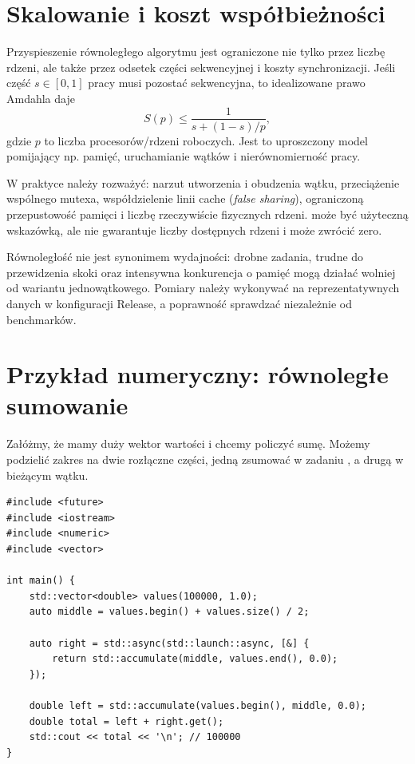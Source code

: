 \section{Skalowanie i koszt współbieżności}

Przyspieszenie równoległego algorytmu jest ograniczone nie tylko przez
liczbę rdzeni, ale także przez odsetek części sekwencyjnej i koszty
synchronizacji. Jeśli część $s\in[0,1]$ pracy musi pozostać sekwencyjna,
to idealizowane prawo Amdahla daje
\[
S(p)\le \frac{1}{s+(1-s)/p},
\]
gdzie $p$ to liczba procesorów/rdzeni roboczych. Jest to uproszczony
model pomijający np. pamięć, uruchamianie wątków i nierównomierność pracy.

W praktyce należy rozważyć: narzut utworzenia i obudzenia wątku,
przeciążenie wspólnego mutexa, współdzielenie linii cache
(\emph{false sharing}), ograniczoną przepustowość pamięci i liczbę
rzeczywiście fizycznych rdzeni. 
może być użyteczną wskazówką, ale nie gwarantuje liczby dostępnych
rdzeni i może zwrócić zero.

Równoległość nie jest synonimem wydajności: drobne zadania,
trudne do przewidzenia skoki oraz intensywna konkurencja o pamięć
mogą działać wolniej od wariantu jednowątkowego. Pomiary należy
wykonywać na reprezentatywnych danych w konfiguracji Release,
a poprawność sprawdzać niezależnie od benchmarków.



\section{Przykład numeryczny: równoległe sumowanie}
\label{sec:numerical}

Załóżmy, że mamy duży wektor wartości i chcemy policzyć sumę. Możemy
podzielić zakres na dwie rozłączne części, jedną zsumować w zadaniu
, a drugą w bieżącym wątku.

\begin{lstlisting}[caption={Dwa niezależne fragmenty obliczenia sumy (C++11).}]
#include <future>
#include <iostream>
#include <numeric>
#include <vector>

int main() {
    std::vector<double> values(100000, 1.0);
    auto middle = values.begin() + values.size() / 2;

    auto right = std::async(std::launch::async, [&] {
        return std::accumulate(middle, values.end(), 0.0);
    });

    double left = std::accumulate(values.begin(), middle, 0.0);
    double total = left + right.get();
    std::cout << total << '\n'; // 100000
}
\end{lstlisting}

